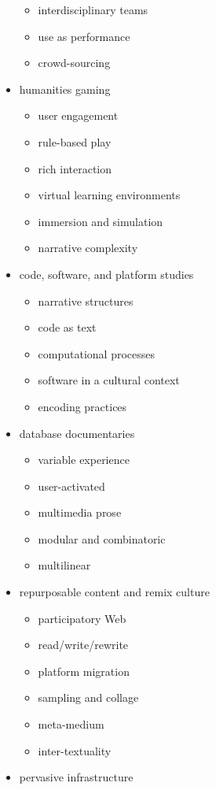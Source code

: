 \begin{itemize}
\begin{itemize}
    \item	interdisciplinary teams
    \item	use as performance
    \item	crowd-sourcing
  \end{itemize}
  \item humanities gaming
  \begin{itemize}
    \item user engagement
    \item	rule-based play
    \item	rich interaction
    \item	virtual learning environments
    \item	immersion and simulation
    \item	narrative complexity
  \end{itemize}
  \item code, software, and platform studies
  \begin{itemize}
    \item narrative structures
    \item	code as text
    \item	computational processes
    \item	software in a cultural context
    \item	encoding practices
  \end{itemize}
  \item database documentaries
  \begin{itemize}
    \item variable experience
    \item	user-activated
    \item	multimedia prose
    \item	modular and combinatoric
    \item	multilinear
  \end{itemize}
  \item repurposable content and remix culture
  \begin{itemize}
    \item participatory Web
    \item	read/write/rewrite
    \item	platform migration
    \item	sampling and collage
    \item	meta-medium
    \item	inter-textuality
  \end{itemize}
  \item pervasive infrastructure

\end{itemize}
